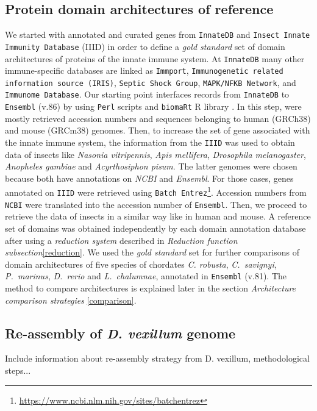 \documentclass[11pt]{article}
\newcommand{\TODO}[1]{\begingroup\color{red}#1\endgroup}
\begin{document}
\subsection*{Protein domain architectures of reference}
We started with annotated and curated genes from \texttt{InnateDB} 
\cite{Breuer01012013} and \texttt{Insect Innate Immunity Database} (IIID) 
\cite{Brucker2012} in order to define a \textsl{gold standard} set of domain 
architectures of proteins of the innate immune system. At \texttt{InnateDB} many 
other immune-specific databases are linked as \texttt{Immport}, 
\texttt{Immunogenetic related information source (IRIS)}, \texttt{Septic Shock 
Group}, \texttt{MAPK/NFKB Network}, and \texttt{Immunome Database}. Our starting 
point interfaces records from \texttt{InnateDB} to \texttt{Ensembl} (v.86) 
by using \texttt{Perl} scripts and \texttt{biomaRt} R library 
\cite{Durinck:2009aa}. In this step, were mostly retrieved accession numbers 
and sequences belonging to human (GRCh38) and mouse (GRCm38) genomes. Then, to 
increase the set of gene associated with the innate immune system, the 
information from the \texttt{IIID} was used to obtain data of insects like 
\textsl{Nasonia vitripennis}, \textsl{Apis mellifera}, \textsl{Drosophila 
melanogaster}, \textsl{Anopheles gambiae} and \textsl{Acyrthosiphon pisum}. The 
latter genomes were chosen because both have annotations on \textsl{NCBI} and 
\textsl{Ensembl}. For those cases, genes annotated on \texttt{IIID} were 
retrieved using \texttt{Batch 
Entrez}\footnote{\url{https://www.ncbi.nlm.nih.gov/sites/batchentrez}}. 
Accession numbers from \texttt{NCBI} were translated into the accession number 
of \texttt{Ensembl}. Then, we proceed to retrieve the data of insects in a 
similar way like in human and mouse. A reference set of domains was obtained 
independently by each domain annotation database after using a \textsl{reduction 
system} described in \textsl{Reduction function subsection}\ref{reduction}. We 
used the \textsl{gold standard} set for further comparisons of domain 
architectures of five species of chordates \textit{C. robusta}, 
\textsl{C.\ savignyi}, \textsl{P.\ marinus}, \textit{D.\ rerio} and \textsl{L.\ 
chalumnae}, annotated in \texttt{Ensembl} (v.81). The method to compare 
architectures is explained later in the section \textsl{Architecture comparison 
strategies} \ref{comparison}.

\subsection*{Re-assembly of \textit{D. vexillum} genome}
\TODO{Include information about re-assembly strategy from D. vexillum, 
methodological steps...}
\end{document}
